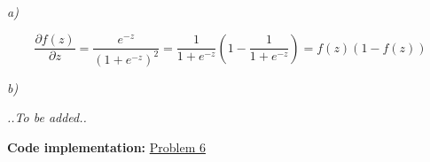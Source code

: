 \documentclass[
]{article}
\begin{document}
\emph{a)}



\[\frac{\partial f(z)}{\partial z} = \frac{e^{- z}}{{(1 + e^{- z})}^{2}} = \frac{1}{1 + e^{- z}}\left( 1 - \frac{1}{1 + e^{- z}} \right) = f(z)(1 - f\left( z \right))\]

\emph{b)}


\begin{center}
  \emph{..To be added..}
\end{center}


\textbf{Code implementation:} \href{https://colab.research.google.com/github/dtungpka/Applied-Mathematics-for-Artificial-Intelligence/blob/main/Assignment_3/Assignment%203.ipynb#scrollTo=Problem_6}{Problem 6}
\end{document}
